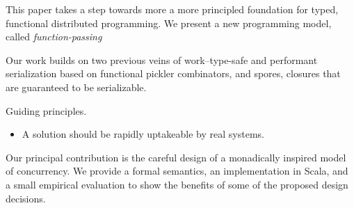 \documentclass[preprint]{sigplanconf}
\theoremstyle{definition}
\theoremstyle{definition}
\begin{document}




This paper takes a step towards more a more principled foundation for typed,
functional distributed programming. We present a new programming model, called
{\em function-passing}

Our work builds on two previous veins of work--type-safe and performant
serialization based on functional pickler combinators, and spores, closures
that are guaranteed to be serializable.

Guiding principles.

\begin{itemize}[noitemsep]
\item A solution should be rapidly uptakeable by real systems.
\end{itemize}

Our principal contribution is the careful design of a monadically inspired
model of concurrency. We provide a formal semantics, an implementation in
Scala, and a small empirical evaluation to show the benefits of some of the
proposed design decisions.


\end{document}
